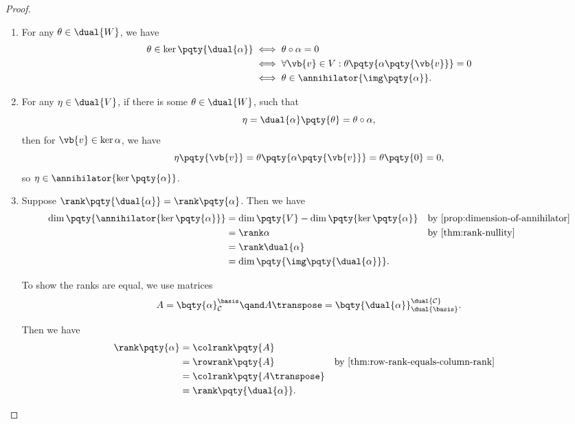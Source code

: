 \begin{proof}
    \begin{enumerate}[label=(\roman*)]
        \item For any \(\theta \in \dual{W}\), we have
        \begin{align*}
            \theta \in \ker\pqty{\dual{\alpha}} &\iff \theta \circ \alpha = 0 \\
            &\iff \forall \vb{v} \in V: \theta\pqty{\alpha\pqty{\vb{v}}} = 0 \\
            &\iff \theta \in \annihilator{\img\pqty{\alpha}}.
        \end{align*}

        \item For any \(\eta \in \dual{V}\), if there is some \(\theta \in \dual{W}\), such that
        \[
            \eta = \dual{\alpha}\pqty{\theta} = \theta \circ \alpha,
        \]
        then for \(\vb{v} \in \ker \alpha\), we have
        \[
            \eta \pqty{\vb{v}} = \theta\pqty{\alpha\pqty{\vb{v}}} = \theta\pqty{0} = 0,
        \]
        so \(\eta \in \annihilator{\ker\pqty{\alpha}}\).

        \item Suppose \(\rank\pqty{\dual{\alpha}} = \rank\pqty{\alpha}\). Then we have
        \begin{align*}
            \dim\pqty{\annihilator{\ker\pqty{\alpha}}} &= \dim\pqty{V} - \dim\pqty{\ker\pqty{\alpha}} && \text{by \autoref{prop:dimension-of-annihilator}} \\
            &= \rank \alpha && \text{by \autoref{thm:rank-nullity}} \\
            &= \rank \dual{\alpha} \\
            &= \dim\pqty{\img\pqty{\dual{\alpha}}}.
        \end{align*}

        To show the ranks are equal, we use matrices
        \[
            A = \bqty{\alpha}_{\mathcal{C}}^{\basis} \qand A\transpose = \bqty{\dual{\alpha}}_{\dual{\basis}}^{\dual{\mathcal{C}}}.
        \]

        Then we have
        \begin{align*}
            \rank\pqty{\alpha} &= \colrank\pqty{A} \\
            &= \rowrank\pqty{A} && \text{by \autoref{thm:row-rank-equals-column-rank}} \\
            &= \colrank\pqty{A\transpose} \\
            &= \rank\pqty{\dual{\alpha}}.
        \end{align*}
        

\end{enumerate}
\end{proof}
